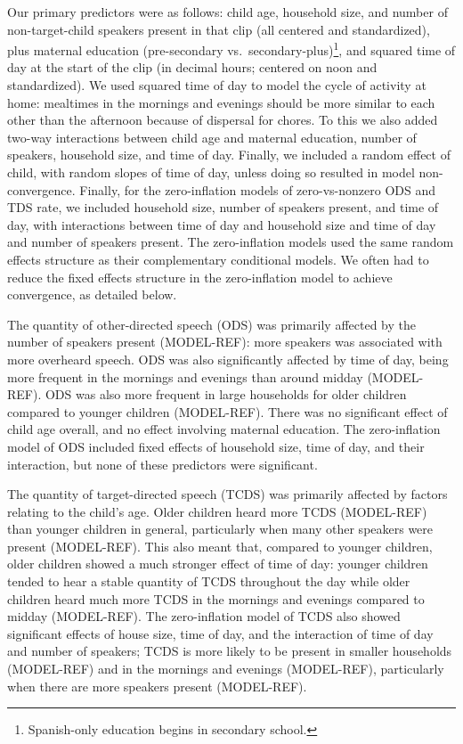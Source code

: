 \documentclass[floatsintext,man]{apa6}
\theoremstyle{definition}
\theoremstyle{definition}
\theoremstyle{definition}
\theoremstyle{remark}
\begin{document}
Our primary predictors were as follows: child age, household size, and
number of non-target-child speakers present in that clip (all centered
and standardized), plus maternal education (pre-secondary
vs.~secondary-plus)\footnote{Spanish-only education begins in secondary school.},
and squared time of day at the start of the clip (in decimal hours;
centered on noon and standardized). We used squared time of day to model
the cycle of activity at home: mealtimes in the mornings and evenings
should be more similar to each other than the afternoon because of
dispersal for chores. To this we also added two-way interactions between
child age and maternal education, number of speakers, household size,
and time of day. Finally, we included a random effect of child, with
random slopes of time of day, unless doing so resulted in model
non-convergence. Finally, for the zero-inflation models of
zero-vs-nonzero ODS and TDS rate, we included household size, number of
speakers present, and time of day, with interactions between time of day
and household size and time of day and number of speakers present. The
zero-inflation models used the same random effects structure as their
complementary conditional models. We often had to reduce the fixed
effects structure in the zero-inflation model to achieve convergence, as
detailed below.

The quantity of other-directed speech (ODS) was primarily affected by
the number of speakers present (MODEL-REF): more speakers was associated
with more overheard speech. ODS was also significantly affected by time
of day, being more frequent in the mornings and evenings than around
midday (MODEL-REF). ODS was also more frequent in large households for
older children compared to younger children (MODEL-REF). There was no
significant effect of child age overall, and no effect involving
maternal education. The zero-inflation model of ODS included fixed
effects of household size, time of day, and their interaction, but none
of these predictors were significant.

The quantity of target-directed speech (TCDS) was primarily affected by
factors relating to the child's age. Older children heard more TCDS
(MODEL-REF) than younger children in general, particularly when many
other speakers were present (MODEL-REF). This also meant that, compared
to younger children, older children showed a much stronger effect of
time of day: younger children tended to hear a stable quantity of TCDS
throughout the day while older children heard much more TCDS in the
mornings and evenings compared to midday (MODEL-REF). The zero-inflation
model of TCDS also showed significant effects of house size, time of
day, and the interaction of time of day and number of speakers; TCDS is
more likely to be present in smaller households (MODEL-REF) and in the
mornings and evenings (MODEL-REF), particularly when there are more
speakers present (MODEL-REF).
\end{document}
